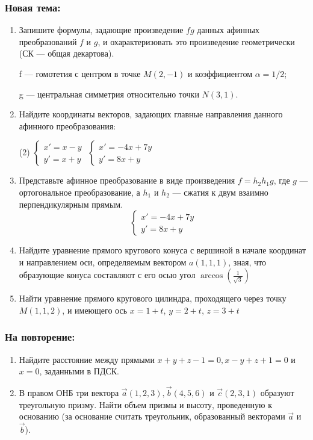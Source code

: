 
\subsubsection*{Новая тема:}

\begin{enumerate}
    \item Запишите формулы, задающие произведение $fg$ данных афинных преобразований $f$ и $g$, и охарактеризовать это произведение геометрически (СК --- общая декартова).
    
    f --- гомотетия с центром в точке $M(2, -1)$ и коэффициентом $\alpha=1/2$;
    
    g --- центральная симметрия относительно точки $N(3, 1)$.
    \item Найдите координаты векторов, задающих главные направления данного афинного преобразования:
    \begin{tasks}(2)
    	\task $\begin{cases}x' = x-y\\y'=x+y\end{cases}$
    	\task $\begin{cases}x' = -4x+7y\\y'=8x+y\end{cases}$
    \end{tasks}
    
    \item Представьте афинное преобразование в виде произведения $f=h_2h_1g$, где $g$ --- ортогональное преобразование, а $h_1$ и $h_2$ --- сжатия к двум взаимно перпендикулярным прямым. 
    $$\begin{cases}x' = -4x+7y\\y'=8x+y\end{cases}$$
    
    \item Найдите уравнение прямого кругового конуса с вершиной в начале координат и направлением оси, определяемым вектором $a(1, 1, 1)$, зная, что образующие конуса составляют с его осью угол $\arccos\left(\frac{1}{\sqrt{3}}\right)$
    
    \item Найти уравнение прямого кругового цилиндра, проходящего через точку $M(1, 1, 2)$, и имеющего ось $x = 1 + t$, $y = 2 + t$, $z = 3 + t$
    
\end{enumerate}

\subsubsection*{На повторение:}
\begin{enumerate}
    \item Найдите расстояние между прямыми $x+y+z-1=0, x-y+z+1=0$ и $x=0$, заданными в ПДСК.
    \item В правом ОНБ три вектора $\vec a(1, 2, 3), \vec b(4, 5, 6)$  и $\vec c(2, 3, 1)$ образуют треугольную призму. Найти объем призмы и высоту, проведенную к основанию (за основание считать треугольник, образованный векторами $\vec a$ и $\vec b$). 
 \end{enumerate}